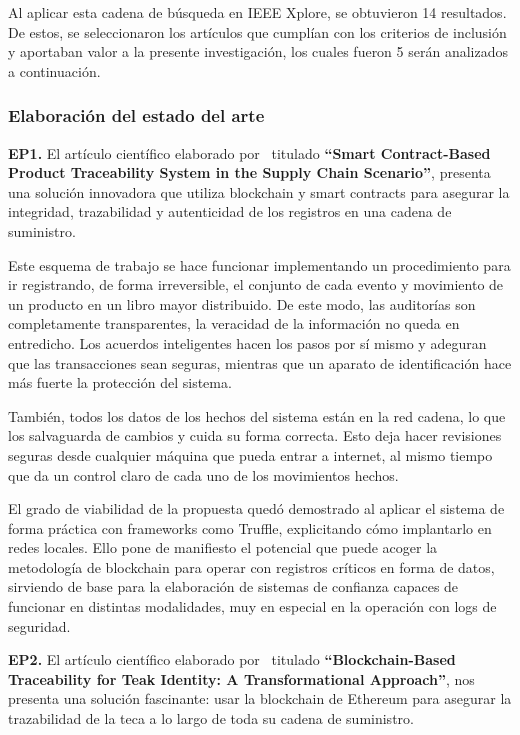 Al aplicar esta cadena de búsqueda en IEEE Xplore, se obtuvieron 14 resultados. De estos, se seleccionaron los artículos que cumplían con los criterios de inclusión y aportaban valor a la presente investigación, los cuales fueron 5 serán analizados a continuación.

\subsubsection{Elaboración del estado del arte}

\textbf{EP1.}  El artículo científico elaborado por~\cite{8804170}  titulado \textbf{“Smart Contract-Based Product Traceability System in the Supply Chain Scenario”}, presenta una solución innovadora que utiliza blockchain y smart contracts para asegurar la integridad, trazabilidad y autenticidad de los registros en una cadena de suministro.

Este esquema de trabajo se hace funcionar implementando un procedimiento para ir registrando, de forma irreversible, el conjunto de cada evento y movimiento de un producto en un libro mayor distribuido. De este modo, las auditorías son completamente transparentes, la veracidad de la información no queda en entredicho.
Los acuerdos inteligentes hacen los pasos por sí mismo y adeguran que las transacciones sean seguras, mientras que un aparato de identificación hace más fuerte la protección del sistema.

También, todos los datos de los hechos del sistema están en la red cadena, lo que los salvaguarda de cambios y cuida su forma correcta. Esto deja hacer revisiones seguras desde cualquier máquina que pueda entrar a internet, al mismo tiempo que da un control claro de cada uno de los movimientos hechos.

El grado de viabilidad de la propuesta quedó demostrado al aplicar el sistema de forma práctica con frameworks como Truffle, explicitando cómo implantarlo en redes locales. Ello pone de manifiesto el potencial que puede acoger la metodología de blockchain para operar con registros críticos en forma de datos, sirviendo de base para la elaboración de sistemas de confianza capaces de funcionar en distintas modalidades, muy en especial en la operación con logs de seguridad. 


\textbf{EP2.}  El artículo científico elaborado por~\cite{sheng2023blockchain}  titulado \textbf{“Blockchain-Based Traceability for Teak Identity: A Transformational Approach”}, nos presenta una solución fascinante: usar la blockchain de Ethereum para asegurar la trazabilidad de la teca a lo largo de toda su cadena de suministro.

